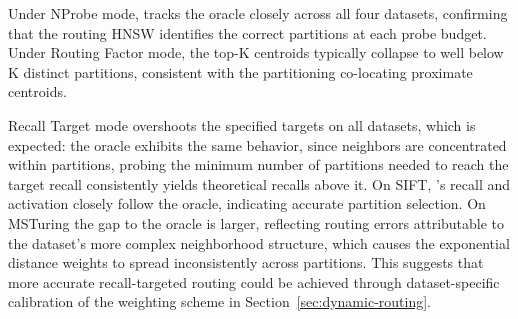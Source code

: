 \documentclass[sigconf,review,anonymous]{acmart}
\begin{document}
 Under NProbe mode, \SystemName{} tracks the oracle closely across all four datasets, confirming that the routing HNSW identifies the correct partitions at each probe budget. Under Routing Factor mode, the top-K centroids typically collapse to well below K distinct partitions, consistent with the partitioning co-locating proximate centroids. 

 Recall Target mode overshoots the specified targets on all datasets, which is expected: the oracle exhibits the same behavior, since neighbors are concentrated within partitions, probing the minimum number of partitions needed to reach the target recall consistently yields theoretical recalls above it. On SIFT, \SystemName{}'s recall and activation closely follow the oracle, indicating accurate partition selection. On MSTuring the gap to the oracle is larger, reflecting routing errors attributable to the dataset's more complex neighborhood structure, which causes the exponential distance weights to spread inconsistently across partitions. This suggests that more accurate recall-targeted routing could be achieved through dataset-specific calibration of the weighting scheme in Section~\ref{sec:dynamic-routing}.
 
 

 
 
\end{document}
